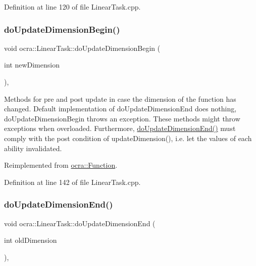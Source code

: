 Definition at line 120 of file Linear\+Task.\+cpp.

\hypertarget{classocra_1_1LinearTask_a31c1140426b2f327e6a126fd917b04cd}{}\label{classocra_1_1LinearTask_a31c1140426b2f327e6a126fd917b04cd} 
\subsubsection{\texorpdfstring{do\+Update\+Dimension\+Begin()}{doUpdateDimensionBegin()}}
{\footnotesize\ttfamily void ocra\+::\+Linear\+Task\+::do\+Update\+Dimension\+Begin (\begin{DoxyParamCaption}\item[{int}]{new\+Dimension }\end{DoxyParamCaption})\hspace{0.3cm}{\ttfamily [protected]}, {\ttfamily [virtual]}}

Methods for pre and post update in case the dimension of the function has changed. Default implementation of do\+Update\+Dimension\+End does nothing, do\+Update\+Dimension\+Begin throws an exception. These methods might throw exceptions when overloaded. Furthermore, {\ttfamily \hyperlink{classocra_1_1LinearTask_aab97e5a858909e724ae8426f141c319b}{do\+Update\+Dimension\+End()}} must comply with the post condition of {\ttfamily update\+Dimension()}, i.\+e. let the values of each ability invalidated. 

Reimplemented from \hyperlink{classocra_1_1Function_afdf98e9f43fde97a5256af88a50cbb39}{ocra\+::\+Function}.



Definition at line 142 of file Linear\+Task.\+cpp.

\hypertarget{classocra_1_1LinearTask_aab97e5a858909e724ae8426f141c319b}{}\label{classocra_1_1LinearTask_aab97e5a858909e724ae8426f141c319b} 
\subsubsection{\texorpdfstring{do\+Update\+Dimension\+End()}{doUpdateDimensionEnd()}}
{\footnotesize\ttfamily void ocra\+::\+Linear\+Task\+::do\+Update\+Dimension\+End (\begin{DoxyParamCaption}\item[{int}]{old\+Dimension }\end{DoxyParamCaption})\hspace{0.3cm}{\ttfamily [protected]}, {\ttfamily [virtual]}}



